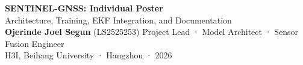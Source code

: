 \documentclass[20pt]{extarticle}
\begin{document}
\noindent
\begin{tcolorbox}[colback=buaaNavy,colframe=buaaNavy,boxrule=0pt,arc=8pt,
                  left=16pt,right=16pt,top=10pt,bottom=10pt]
  \begin{center}
    {\fontsize{46}{54}\bfseries\color{white} SENTINEL-GNSS: Individual Poster}\\[6pt]
    {\fontsize{26}{32}\color{buaaSky}
     Architecture, Training, EKF Integration, and Documentation}\\[8pt]
    {\large\color{white}
     \textbf{Ojerinde Joel Segun} (LS2525253) \quad
     Project Lead · Model Architect · Sensor Fusion Engineer}\\[4pt]
    {\normalsize\color{white!70!buaaSky}
     H3I, Beihang University · Hangzhou · 2026}
  \end{center}
\end{tcolorbox}

\vspace{0.5cm}
\end{document}
